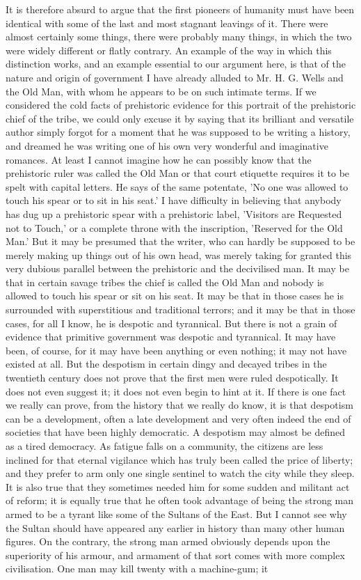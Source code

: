 It is therefore absurd to argue that the first pioneers of humanity must have been identical with some of the last and most stagnant leavings of it. There were almost certainly some things, there were probably many things, in which the two were widely different or flatly contrary. An example of the way in which this distinction works, and an example essential to our argument here, is that of the nature and origin of government I have already alluded to Mr. H. G. Wells and the Old Man, with whom he appears to be on such intimate terms. If we considered the cold facts of prehistoric evidence for this portrait of the prehistoric chief of the tribe, we could only excuse it by saying that its brilliant and versatile author simply forgot for a moment that he was supposed to be writing a history, and dreamed he was writing one of his own very wonderful and imaginative romances. At least I cannot imagine how he can possibly know that the prehistoric ruler was called the Old Man or that court etiquette requires it to be spelt with capital letters. He says of the same potentate, 'No one was allowed to touch his spear or to sit in his seat.' I have difficulty in believing that anybody has dug up a prehistoric spear with a prehistoric label, 'Visitors are Requested not to Touch,' or a complete throne with the inscription, 'Reserved for the Old Man.' But it may be presumed that the writer, who can hardly be supposed to be merely making up things out of his own head, was merely taking for granted this very dubious parallel between the prehistoric and the decivilised man. It may be that in certain savage tribes the chief is called the Old Man and nobody is allowed to touch his spear or sit on his seat. It may be that in those cases he is surrounded with superstitious and traditional terrors; and it may be that in those cases, for all I know, he is despotic and tyrannical. But there is not a grain of evidence that primitive government was despotic and tyrannical. It may have been, of course, for it may have been anything or even nothing; it may not have existed at all. But the despotism in certain dingy and decayed tribes in the twentieth century does not prove that the first men were ruled despotically. It does not even suggest it; it does not even begin to hint at it. If there is one fact we really can prove, from the history that we really do know, it is that despotism can be a development, often a late development and very often indeed the end of societies that have been highly democratic. A despotism may almost be defined as a tired democracy. As fatigue falls on a community, the citizens are less inclined for that eternal vigilance which has truly been called the price of liberty; and they prefer to arm only one single sentinel to watch the city while they sleep. It is also true that they sometimes needed him for some sudden and militant act of reform; it is equally true that he often took advantage of being the strong man armed to be a tyrant like some of the Sultans of the East. But I cannot see why the Sultan should have appeared any earlier in history than many other human figures. On the contrary, the strong man armed obviously depends upon the superiority of his armour, and armament of that sort comes with more complex civilisation. One man may kill twenty with a machine-gum; it 